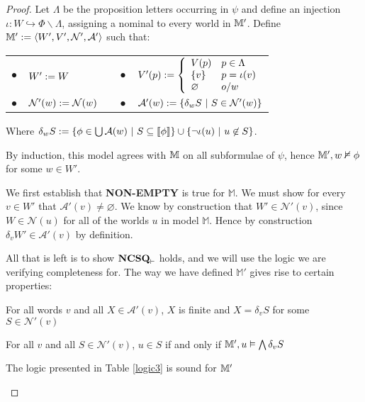 \begin{proof}
  
  
  
  Let $\Lambda$ be the proposition letters occurring in
  $\psi$ and define an injection $\iota : W \hookrightarrow \Phi \backslash
  \Lambda$, assigning a nominal to every world in $\mathbbm{M}'$.  Define
  $\mathbbm{M}' \assign \langle W', V', \mathcal{N}', \mathcal{A}'
  \rangle$ such that:
  
  \begin{center}
    \begin{tabular}{lllll}
      $\bullet$ & $W' \assign W$ &  & $\bullet$ & $V' (p) \assign \left\{
      \begin{array}{ll}
        V (p) & p \in \Lambda\\
        \{v\} & p = \iota (v)\\
        \varnothing & o / w
      \end{array} \right.$\\
      $\bullet$ & $\mathcal{N}'(w) \assign \mathcal{N}(w)$ & {\hspace{3em}} &  $\bullet$ & $\mathcal{A}'(w) \assign \{\delta_w S \  |
      \  S \in \mathcal{N}'(w) \}$
    \end{tabular}
  \end{center}
  Where $\delta_w S \assign \{ \phi \in
  \bigcup \mathcal{A}(w) \  | \ S \subseteq \left\llbracket \phi
  \right\rrbracket \} \cup \{\neg \iota (u) \  |
  \  u \nin S\}$.
  
  By induction, this model agrees with $\mathbbm{M}$ on all subformulae of $\psi$, hence
  $\mathbbm{M}', w \nvDash \phi$ for some $w\in W'$.
  
  We first establish that \textbf{NON-EMPTY} is true for
  $\mathbb{M}$. We must show for every $v \in W'$ that $\mathcal{A}'(v)
  \neq \varnothing$.  We know by construction that $W' \in
  \mathcal{N}'(v)$, since $W \in \mathcal{N}(u)$ for all of the worlds
  $u$ in model $\mathbb{M}$.  Hence by construction $\delta_v W' \in
  \mathcal{A}'(v)$ by definition.

  All that is left is to show $\text{\tmtextbf{NCSQ}}_\vdash$ holds,
  and we will use the logic we are verifying completeness for. The way we have
  defined $\mathbb{M}'$ gives rise to certain properties:
  \begin{enumerateroman}
    \item For all words $v$ and all $X \in \mathcal{A}'(v)$, $X$ is finite and  $X = \delta_v S$ for some $S \in \mathcal{N}'(v)$
    \item For all $v$ and all $S \in \mathcal{N}'(v)$, $u \in S$ if and only if
    $\mathbbm{M}', u \vDash \bigwedge \delta_v S$
    \item The logic presented in Table \ref{logic3} is sound for
    $\mathbbm{M}'$
  \end{enumerateroman}


\end{proof}
